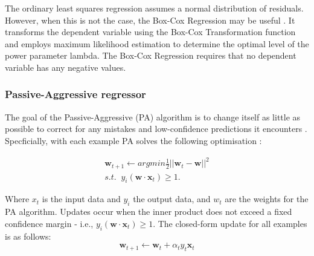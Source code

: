 \documentclass[final,3p,times,twocolumn,numbers]{elsarticle}
\begin{document}
The ordinary least squares regression assumes a normal distribution of residuals. However, when this is not the case, the Box-Cox Regression may be useful \cite{Box1964}. It transforms the dependent variable using the Box-Cox Transformation function and employs maximum likelihood estimation to determine the optimal level of the power parameter lambda. The Box-Cox Regression requires that no dependent variable has any negative values.


%
%
%
%

\subsubsection{Passive-Aggressive regressor}

The goal of the Passive-Aggressive (PA) algorithm is to change itself as little as possible to correct for any mistakes and low-confidence predictions it encounters \cite{Gzik2014}. Specficially, with each example PA solves the following optimisation \cite{Ma2009}:

\begin{align}
    \boldsymbol{w}_{t+1}\leftarrow argmin \frac{1}{2}\left|\left|{\boldsymbol{w}_t-\boldsymbol{w}}\right|\right|^2 \\
    s.t. \; \; y_i(\boldsymbol{w}\cdot \boldsymbol{x}_t)\geq1.
\end{align}

\noindent Where $x_t$ is the input data and $y_i$ the output data, and $w_t$ are the weights for the PA algorithm. Updates occur when the inner product does not exceed a fixed confidence margin - i.e., $y_i(\boldsymbol{w}\cdot \boldsymbol{x}_t)\geq1$. The closed-form update for all examples is as follows:
\begin{equation}
    \boldsymbol{w}_{t+1}\leftarrow \boldsymbol{w}_{t} + \alpha_t y_t \boldsymbol{x}_t
\end{equation}
\end{document}
